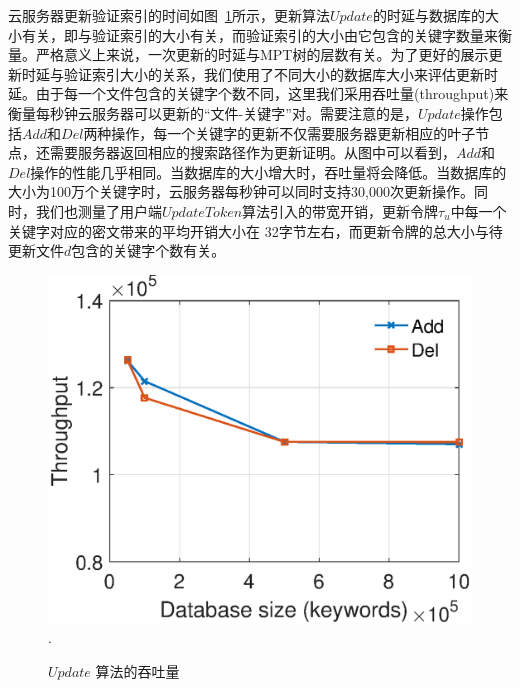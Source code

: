 云服务器更新验证索引的时间如图~\ref{fig:update}所示，更新算法$Update$的时延与数据库的大小有关，即与验证索引的大小有关，而验证索引的大小由它包含的关键字数量来衡量。严格意义上来说，一次更新的时延与MPT树的层数有关。为了更好的展示更新时延与验证索引大小的关系，我们使用了不同大小的数据库大小来评估更新时延。由于每一个文件包含的关键字个数不同，这里我们采用吞吐量(throughput)来衡量每秒钟云服务器可以更新的“文件-关键字”对。需要注意的是，$Update$操作包括$Add$和$Del$两种操作，每一个关键字的更新不仅需要服务器更新相应的叶子节点，还需要服务器返回相应的搜索路径作为更新证明。从图中可以看到，$Add$和$Del$操作的性能几乎相同。当数据库的大小增大时，吞吐量将会降低。当数据库的大小为100万个关键字时，云服务器每秒钟可以同时支持30,000次更新操作。同时，我们也测量了用户端$UpdateToken$算法引入的带宽开销，更新令牌$\tau_u$中每一个关键字对应的密文带来的平均开销大小在 32字节左右，而更新令牌的总大小与待更新文件$d$包含的关键字个数有关。
\begin{figure}[h]
\centering
\includegraphics[width=3.5 in]{expr/update}
\DeclareGraphicsExtensions.
\caption{$Update$ 算法的吞吐量}
\label{fig:update}
\end{figure}



